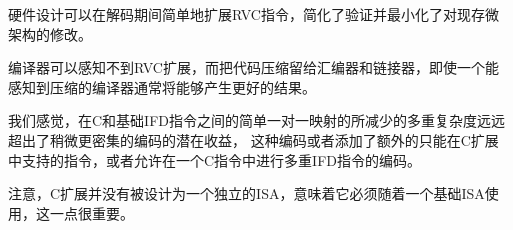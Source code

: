 \begin{tightlist}
\item 硬件设计可以在解码期间简单地扩展RVC指令，简化了验证并最小化了对现存微架构的修改。
\item 编译器可以感知不到RVC扩展，而把代码压缩留给汇编器和链接器，即使一个能感知到压缩的编译器通常将能够产生更好的结果。
\end{tightlist}

\begin{commentary}
我们感觉，在C和基础IFD指令之间的简单一对一映射的所减少的多重复杂度远远超出了稍微更密集的编码的潜在收益，
这种编码或者添加了额外的只能在C扩展中支持的指令，或者允许在一个C指令中进行多重IFD指令的编码。
\end{commentary}

注意，C扩展并没有被设计为一个独立的ISA，意味着它必须随着一个基础ISA使用，这一点很重要。

